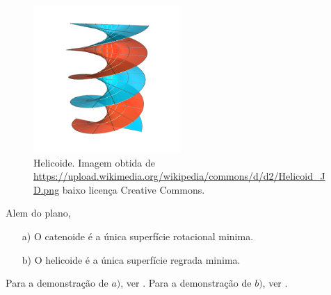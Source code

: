 \begin{figure}
	\centering
	\includegraphics[width=0.5\textwidth]{images/helicoid}
	\caption{Helicoide. Imagem obtida de \url{https://upload.wikimedia.org/wikipedia/commons/d/d2/Helicoid_JD.png} baixo licença Creative Commons.}
\end{figure}

\begin{teorema}
	Alem do plano,
	\begin{enumerate}
		\item[a)] O catenoide é a única superfície rotacional minima.
		\item[b)] O helicoide é a única superfície regrada minima.
	\end{enumerate}
\end{teorema}

\begin{demonstracao}
	Para a demonstração de $a)$, ver \cite[§3.5, Exemplo 5]{Carmo2010}. 
	Para a demonstração de $b)$, ver \cite[§3.5, Exemplo 6]{Carmo2010}.
\end{demonstracao}


